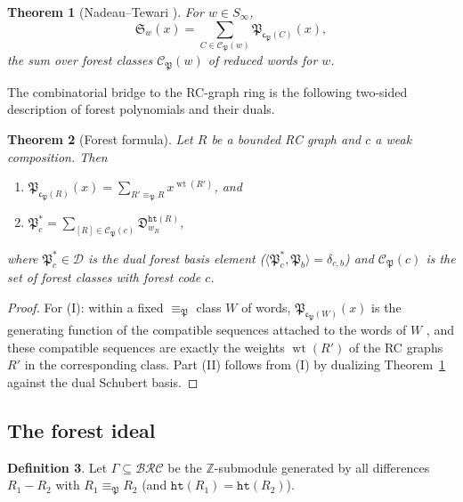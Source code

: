 \documentclass{amsart}
\newtheorem{theorem}{Theorem}[section]
\theoremstyle{definition}
\newtheorem{definition}[theorem]{Definition}
\theoremstyle{remark}
\newcommand{\BRC}{\mathcal{BRC}}
\newcommand{\dcoma}{\mathcal{D}}
\newcommand{\forest}{\mathfrak{P}}
\newcommand{\dsch}{\mathfrak{D}}
\newcommand{\code}{\mathfrak{c}}
\newcommand{\wtt}{\operatorname{wt}}
\newcommand{\wof}[1]{w_{#1}}
\newcommand{\hr}{\mathtt{ht}}
\newcommand{\sch}{\mathfrak{S}}
\begin{document}
\begin{theorem}[{Nadeau--Tewari \cite[Theorem~1.4]{nadeau2024forest}}]\label{theorem:forestforest}
For $w\in S_\infty$,
\[
\sch_w(x)=\sum_{C\in\mathcal{C}_{\forest}(w)}\forest_{\code_{\forest}(C)}(x),
\]
the sum over forest classes $\mathcal{C}_{\forest}(w)$ of reduced words for $w$.
\end{theorem}

The combinatorial bridge to the RC-graph ring is the following two-sided description of forest polynomials and their duals.

\begin{theorem}[Forest formula]\label{theorem:forestformula}
Let $R$ be a bounded RC graph and $c$ a weak composition. Then
\begin{enumerate}
\item[\textup{(I)}] $\displaystyle \forest_{\code_{\forest}(R)}(x)=\sum_{R'\equiv_{\forest}R}x^{\wtt(R')}$, and
\item[\textup{(II)}] $\displaystyle \forest^*_c=\sum_{[R]\in\mathcal{C}_{\forest}(c)}\dsch_{\wof{R}}^{\hr(R)}$,
\end{enumerate}
where $\forest_c^*\in\dcoma$ is the dual forest basis element ($\langle\forest_c^*,\forest_b\rangle=\delta_{c,b}$) and $\mathcal{C}_{\forest}(c)$ is the set of forest classes with forest code $c$.
\end{theorem}
\begin{proof}
For (I): within a fixed $\equiv_{\forest}$ class $W$ of words, $\forest_{\code_{\forest}(W)}(x)$ is the generating function of the compatible sequences attached to the words of $W$ \cite[Proposition~5.10]{nadeau2024forest}, and these compatible sequences are exactly the weights $\wtt(R')$ of the RC graphs $R'$ in the corresponding class. Part (II) follows from (I) by dualizing Theorem~\ref{theorem:forestforest} against the dual Schubert basis.
\end{proof}

\subsection{The forest ideal}

\begin{definition}\label{definition:gamma}
Let $\Gamma\subseteq\BRC$ be the $\mathbb{Z}$-submodule generated by all differences $R_1-R_2$ with $R_1\equiv_{\forest}R_2$ (and $\hr(R_1)=\hr(R_2)$).
\end{definition}
\end{document}
